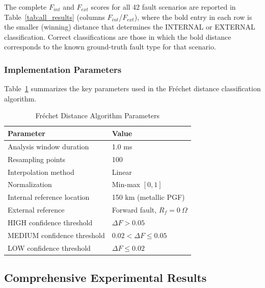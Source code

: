 \documentclass[journal]{IEEEtran}
\begin{document}
The complete $F_{int}$ and $F_{ext}$ scores for all 42 fault scenarios are reported in Table~\ref{tab:all_results} (columns $F_{int}$/$F_{ext}$), where the bold entry in each row is the smaller (winning) distance that determines the INTERNAL or EXTERNAL classification. Correct classifications are those in which the bold distance corresponds to the known ground-truth fault type for that scenario.

\subsubsection{Implementation Parameters}

Table~\ref{tab:fd_parameters} summarizes the key parameters used in the Fréchet distance classification algorithm.

\begin{table}[!t]
    \centering
    \caption{Fr\'{e}chet Distance Algorithm Parameters}
    \label{tab:fd_parameters}
    \begin{tabular}{@{}ll@{}}
        \toprule
        \textbf{Parameter} & \textbf{Value} \\
        \midrule
        Analysis window duration     & 1.0 ms \\
        Resampling points            & 100 \\
        Interpolation method         & Linear \\
        Normalization                & Min-max $[0, 1]$ \\
        Internal reference location  & 150 km (metallic PGF) \\
        External reference           & Forward fault, $R_f = 0~\Omega$ \\
        HIGH confidence threshold    & $\Delta F > 0.05$ \\
        MEDIUM confidence threshold  & $0.02 < \Delta F \leq 0.05$ \\
        LOW confidence threshold     & $\Delta F \leq 0.02$ \\
        \bottomrule
    \end{tabular}
\end{table}


\subsection{Comprehensive Experimental Results}
\end{document}
